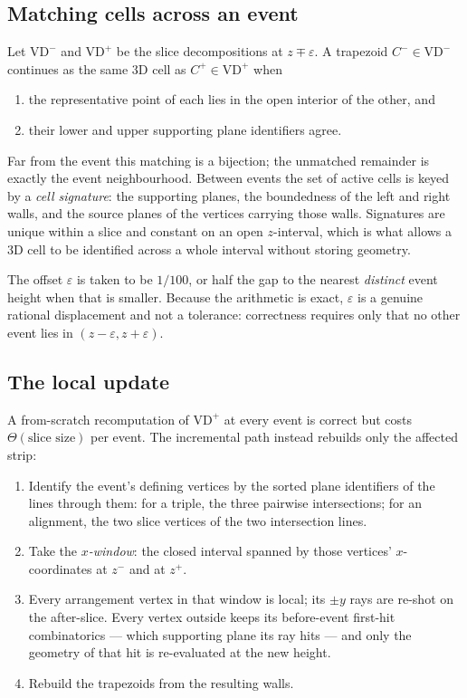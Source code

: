 \documentclass[11pt]{article}
\newcommand{\VD}{\mathrm{VD}}
\begin{document}
\subsection{Matching cells across an event}

Let $\VD^-$ and $\VD^+$ be the slice decompositions at $z \mp \varepsilon$.  A
trapezoid $C^- \in \VD^-$ continues as the same 3D cell as $C^+ \in \VD^+$ when

\begin{enumerate}
\item the representative point of each lies in the open interior of the other, and
\item their lower and upper supporting plane identifiers agree.
\end{enumerate}

Far from the event this matching is a bijection; the unmatched remainder is
exactly the event neighbourhood.  Between events the set of active cells is
keyed by a \emph{cell signature}: the supporting planes, the boundedness of the
left and right walls, and the source planes of the vertices carrying those
walls.  Signatures are unique within a slice and constant on an open
$z$-interval, which is what allows a 3D cell to be identified across a whole
interval without storing geometry.

The offset $\varepsilon$ is taken to be $1/100$, or half the gap to the nearest
\emph{distinct} event height when that is smaller.  Because the arithmetic is
exact, $\varepsilon$ is a genuine rational displacement and not a tolerance:
correctness requires only that no other event lies in $(z-\varepsilon,
z+\varepsilon)$.

\subsection{The local update}

A from-scratch recomputation of $\VD^+$ at every event is correct but costs
$\Theta(\text{slice size})$ per event.  The incremental path instead rebuilds
only the affected strip:

\begin{enumerate}
\item Identify the event's defining vertices by the sorted plane identifiers of
  the lines through them: for a triple, the three pairwise intersections; for
  an alignment, the two slice vertices of the two intersection lines.
\item Take the \emph{$x$-window}: the closed interval spanned by those vertices'
  $x$-coordinates at $z^-$ and at $z^+$.
\item Every arrangement vertex in that window is local; its $\pm y$ rays are
  re-shot on the after-slice.  Every vertex outside keeps its before-event
  first-hit combinatorics --- which supporting plane its ray hits --- and only
  the geometry of that hit is re-evaluated at the new height.
\item Rebuild the trapezoids from the resulting walls.
\end{enumerate}
\end{document}
